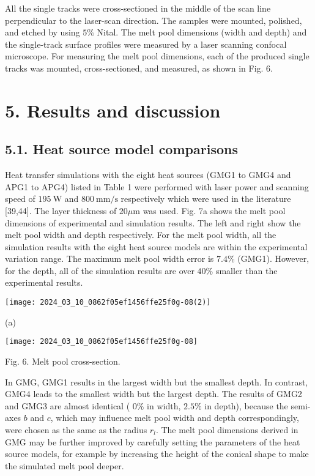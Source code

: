 \documentclass[10pt]{article}
\begin{document}
All the single tracks were cross-sectioned in the middle of the scan line perpendicular to the laser-scan direction. The samples were mounted, polished, and etched by using $5 \%$ Nital. The melt pool dimensions (width and depth) and the single-track surface profiles were measured by a laser scanning confocal microscope. For measuring the melt pool dimensions, each of the produced single tracks was mounted, cross-sectioned, and measured, as shown in Fig. 6.

\section*{5. Results and discussion}
\subsection*{5.1. Heat source model comparisons}
Heat transfer simulations with the eight heat sources (GMG1 to GMG4 and APG1 to APG4) listed in Table 1 were performed with laser power and scanning speed of $195 \mathrm{~W}$ and $800 \mathrm{~mm} / \mathrm{s}$ respectively which were used in the literature [39,44]. The layer thickness of $20 \mu \mathrm{m}$ was used. Fig. 7a shows the melt pool dimensions of experimental and simulation results. The left and right show the melt pool width and depth respectively. For the melt pool width, all the simulation results with the eight heat source models are within the experimental variation range. The maximum melt pool width error is $7.4 \%$ (GMG1). However, for the depth, all of the simulation results are over $40 \%$ smaller than the experimental results.

\begin{center}
\texttt{[image: 2024\_03\_10\_0862f05ef1456ffe25f0g-08(2)]}
\end{center}

(a)

\begin{center}
\texttt{[image: 2024\_03\_10\_0862f05ef1456ffe25f0g-08]}
\end{center}

Fig. 6. Melt pool cross-section.

In GMG, GMG1 results in the largest width but the smallest depth. In contrast, GMG4 leads to the smallest width but the largest depth. The results of GMG2 and GMG3 are almost identical ( $0 \%$ in width, $2.5 \%$ in depth), because the semi-axes $b$ and $c$, which may influence melt pool width and depth correspondingly, were chosen as the same as the radius $r_{l}$. The melt pool dimensions derived in GMG may be further improved by carefully setting the parameters of the heat source models, for example by increasing the height of the conical shape to make the simulated melt pool deeper.
\end{document}
